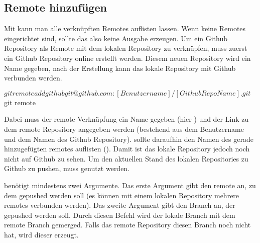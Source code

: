 \subsection{Remote hinzufügen}
Mit  kann man alle verknüpften Remotes auflisten lassen. Wenn keine Remotes eingerichtet sind, sollte das also keine Ausgabe erzeugen. Um ein Github Repository als Remote mit dem lokalen Repository zu verknüpfen, muss zuerst ein Github Repository online erstellt werden. Diesem neuen Repository wird ein Name gegeben, nach der Erstellung kann das lokale Repository mit Github verbunden werden.
\begin{mplisting}
$ git remote add github git@github.com:[Benutzername]/[Github Repo Name].git
$ git remote
\end{mplisting} 
Dabei muss der remote Verknüpfung ein Name gegeben (hier ) und der Link zu dem remote Repository angegeben werden (bestehend aus dem Benutzername und dem Namen des Github Repository).  sollte daraufhin den Namen des gerade hinzugefügten remotes auflisten (). Damit ist das lokale Repository jedoch noch nicht auf Github zu sehen. Um den aktuellen Stand des lokalen Repositories zu Github zu pushen, muss  genutzt werden.
 benötigt mindestens zwei Argumente. Das erste Argument gibt den remote an, zu dem gepushed werden soll (es können mit einem lokalen Repository mehrere remotes verbunden werden). Das zweite Argument gibt den Branch an, der gepushed werden soll. Durch diesen Befehl wird der lokale Branch mit dem remote Branch gemerged. Falls das remote Repository diesen Branch noch nicht hat, wird dieser erzeugt.
